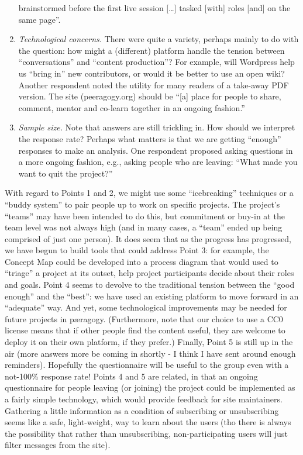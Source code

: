 \begin{enumerate}
  brainstormed before the first live session {[}\ldots{}{]} tasked
  {[}with{]} roles {[}and{]} on the same page''.
\item
  \emph{Technological concerns.} There were quite a variety, perhaps
  mainly to do with the question: how might a (different) platform
  handle the tension between ``conversations'' and ``content
  production''? For example, will Wordpress help us ``bring in'' new
  contributors, or would it be better to use an open wiki? Another
  respondent noted the utility for many readers of a take-away PDF
  version. The site (peeragogy.org) should be ``{[}a{]} place for people
  to share, comment, mentor and co-learn together in an ongoing
  fashion.''
\item
  \emph{Sample size.} Note that answers are still trickling in. How
  should we interpret the response rate? Perhaps what matters is that we
  are getting ``enough'' responses to make an analysis. One respondent
  proposed asking questions in a more ongoing fashion, e.g., asking
  people who are leaving: ``What made you want to quit the project?''
\end{enumerate}

With regard to Points 1 and 2, we might use some ``icebreaking''
techniques or a ``buddy system'' to pair people up to work on specific
projects. The project's ``teams'' may have been intended to do this, but
commitment or buy-in at the team level was not always high (and in many
cases, a ``team'' ended up being comprised of just one person). It does
seem that as the progress has progressed, we have begun to build tools
that could address Point 3: for example, the Concept Map could be
developed into a process diagram that would used to ``triage'' a project
at its outset, help project participants decide about their roles and
goals. Point 4 seems to devolve to the traditional tension between the
``good enough'' and the ``best'': we have used an existing platform to
move forward in an ``adequate'' way. And yet, some technological
improvements may be needed for future projects in pæragogy.
(Furthermore, note that our choice to use a CC0 license means that if
other people find the content useful, they are welcome to deploy it on
their own platform, if they prefer.) Finally, Point 5 is still up in the
air (more answers more be coming in shortly - I think I have sent around
enough reminders). Hopefully the questionnaire will be useful to the
group even with a not-100\% response rate! Points 4 and 5 are related,
in that an ongoing questionnaire for people leaving (or joining) the
project could be implemented as a fairly simple technology, which would
provide feedback for site maintainers. Gathering a little information as
a condition of subscribing or unsubscribing seems like a safe,
light-weight, way to learn about the users (tho there is always the
possibility that rather than unsubscribing, non-participating users will
just filter messages from the site).

